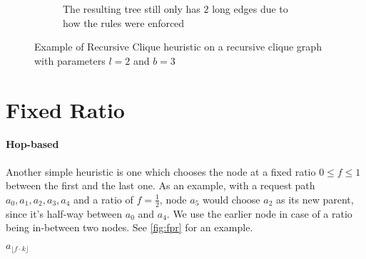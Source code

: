\documentclass[a4paper, oneside]{discothesis}
\begin{document}
\begin{figure}
\begin{subfigure}[t]{0.5\textwidth}
\caption{The resulting tree still only has $2$ long edges due to how the rules were enforced}
\end{subfigure}
\caption{Example of Recursive Clique heuristic on a recursive clique graph with parameters $l=2$ and $b=3$}
\label{fig:reclique-alg}
\end{figure}

\section{Fixed Ratio}\label{alg:fr}

\paragraph{Hop-based}\label{alg:frh}

Another simple heuristic is one which chooses the node at a fixed ratio $0\leq f\leq 1$ between the first and the last one. As an example, with a request path $a_{0},a_{1},a_{2},a_{3},a_{4}$ and a ratio of $f=\frac{1}{2}$, node $a_{5}$ would choose $a_{2}$ as its new parent, since it's half-way between $a_{0}$ and $a_{4}$. We use the earlier node in case of a ratio being in-between two nodes. See \autoref{fig:fpr} for an example.

\begin{algorithmic}
\State\Return $a_{\lfloor f\cdot k\rfloor}$
\EndFunction
\end{algorithmic}
\end{document}
